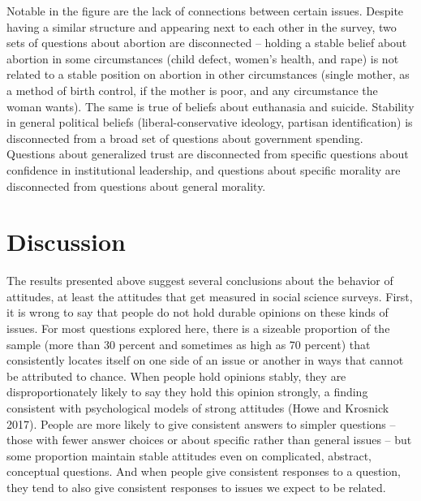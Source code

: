 \documentclass[12pt,]{article}
\begin{document}
Notable in the figure are the lack of connections between certain issues. Despite having a similar structure and appearing next to each other in the survey, two sets of questions about abortion are disconnected -- holding a stable belief about abortion in some circumstances (child defect, women's health, and rape) is not related to a stable position on abortion in other circumstances (single mother, as a method of birth control, if the mother is poor, and any circumstance the woman wants). The same is true of beliefs about euthanasia and suicide. Stability in general political beliefs (liberal-conservative ideology, partisan identification) is disconnected from a broad set of questions about government spending. Questions about generalized trust are disconnected from specific questions about confidence in institutional leadership, and questions about specific morality are disconnected from questions about general morality.

\hypertarget{discussion}{%
\section{Discussion}\label{discussion}}

The results presented above suggest several conclusions about the behavior of attitudes, at least the attitudes that get measured in social science surveys. First, it is wrong to say that people do not hold durable opinions on these kinds of issues. For most questions explored here, there is a sizeable proportion of the sample (more than 30 percent and sometimes as high as 70 percent) that consistently locates itself on one side of an issue or another in ways that cannot be attributed to chance. When people hold opinions stably, they are disproportionately likely to say they hold this opinion strongly, a finding consistent with psychological models of strong attitudes (Howe and Krosnick 2017). People are more likely to give consistent answers to simpler questions -- those with fewer answer choices or about specific rather than general issues -- but some proportion maintain stable attitudes even on complicated, abstract, conceptual questions. And when people give consistent responses to a question, they tend to also give consistent responses to issues we expect to be related.
\end{document}
